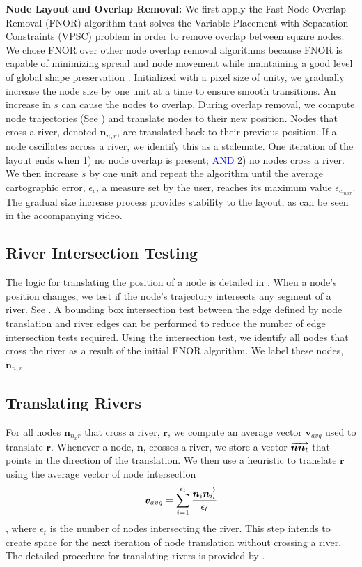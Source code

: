 \documentclass[Afour,sagev,times]{sagej}
\newcommand{\new}[1]{\textcolor{blue}{#1}}
\newcommand{\bobgraph}[1]{\noindent\textbf{#1}}
\newcommand{\Vector}[1]{\protect\overrightarrow{#1}}
\newcommand{\nodeSize}{s}
\newcommand{\nodeError}{\epsilon}
\newcommand{\nodeCartographicError}{\nodeError_{c}}
\newcommand{\nodeCartographicErrorMax}{\nodeError_{c_{max}}}
\newcommand{\nodeTopologicalError}{\nodeError_{t}}
\newcommand{\node}{\bm{n}}
\newcommand{\river}{\bm{r}}
\newcommand{\nodeVectorNNn}{\Vector{\node\node_{t}}}
\newcommand{\vectorAvg}{\bm{v}_{avg}}
\newcommand{\NxR}{\node_{n_{x}r}}
\begin{document}
\bobgraph{Node Layout and Overlap Removal:} We first apply the Fast Node Overlap Removal (FNOR) algorithm that solves the Variable Placement with Separation Constraints (VPSC) problem \cite{dwyer2006Fast} in order to remove overlap between square nodes. We chose FNOR over other node overlap removal algorithms because FNOR is capable of minimizing spread and node movement while maintaining a good level of global shape preservation \cite{chen2020Node}. Initialized with a pixel size of unity, we gradually increase the node size by one unit at a time to ensure smooth transitions. An increase in $ \nodeSize $ can cause the nodes to overlap. During overlap removal, we compute node trajectories (See ) and translate nodes to their new position. Nodes that cross a river, denoted $ \NxR $, are translated back to their previous position. If a node oscillates across a river, we identify this as a stalemate. One iteration of the layout ends when 1) no node overlap is present; \new{AND} 2) no nodes cross a river. We then increase $ \nodeSize $ by one unit and repeat the algorithm until the average cartographic error, $ \nodeCartographicError $, a measure set by the user, reaches its maximum value $ \nodeCartographicErrorMax $. The gradual size increase process provides stability to the layout, as can be seen in the accompanying video.

\subsection{River Intersection Testing}
\label{subsec:{River Intersection Testing}}

The logic for translating the position of a node is detailed in . When a node's position changes, we test if the node's trajectory intersects any segment of a river. See . A bounding box intersection test between the edge defined by node translation and river edges can be performed to reduce the number of edge intersection tests required. Using the intersection test, we identify all nodes that cross the river as a result of the initial FNOR algorithm. We label these nodes, $ \NxR $.

\subsection{Translating Rivers}
\label{subsec:{Translating Rivers}}

For all nodes $ \NxR $ that cross a river, $ \river $, we compute an average vector $ \vectorAvg $ used to translate $ \river $. Whenever a node, $ \node $, crosses a river, we store a vector $ \nodeVectorNNn $ that points in the direction of the translation. We then use a heuristic to translate $ \river $ using the average vector of node intersection $$ \vectorAvg = \sum_{i=1}^{\nodeTopologicalError} \frac{\Vector{\node_i\node_{i_t}}}{\nodeTopologicalError} $$, where $ \nodeTopologicalError $ is the number of nodes intersecting the river. This step intends to create space for the next iteration of node translation without crossing a river. The detailed procedure for translating rivers is provided by .
\end{document}
